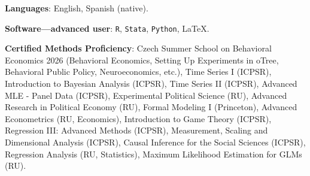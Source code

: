 
{\bf Languages}: English, Spanish (native).


{\bf Software---advanced user}: \texttt{R}, \texttt{Stata}, \texttt{Python}, \LaTeX.

{\bf Certified Methods Proficiency}: Czech Summer School on Behavioral Economics 2026 (Behavioral Economics, Setting Up Experiments in oTree, Behavioral Public Policy, Neuroeconomics, etc.), Time Series I (ICPSR), Introduction to Bayesian Analysis (ICPSR), Time Series II (ICPSR), Advanced MLE - Panel Data (ICPSR), Experimental Political Science (RU), Advanced Research in Political Economy (RU), Formal Modeling I (Princeton), Advanced Econometrics (RU, Economics), Introduction to Game Theory (ICPSR), Regression III: Advanced Methods (ICPSR), Measurement, Scaling and Dimensional Analysis (ICPSR), Causal Inference for the Social Sciences (ICPSR), Regression Analysis (RU, Statistics), Maximum Likelihood Estimation for GLMs (RU).


